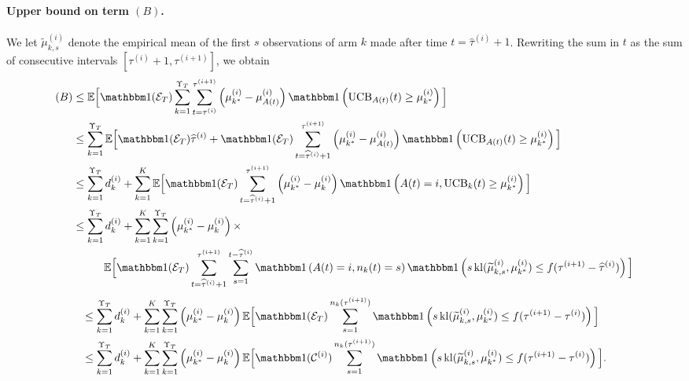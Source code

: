 \paragraph{Upper bound on term $(B)$.}
%
We let $\widetilde{\mu}_{k,s}^{(i)}$ denote the empirical mean of the first $s$ observations of arm $k$ made after time $t=\widehat{\tau}^{(i)}+1$.
Rewriting the sum in $t$ as the sum of consecutive intervals $[\tau^{(i)}+1, \tau^{(i+1)}]$, we obtain
%
\begin{align*}
    (B) & \leq \bE\Big[\indic(\cE_T)\sum_{k=1}^{\Upsilon_T} \sum_{t=\tau^{(i)}}^{\tau^{(i+1)}}\left(\mu_{k^*}^{(i)} - \mu_{A(t)}^{(i)}\right)\indic\left(\UCB_{A(t)}(t) \geq \mu_{k^*}^{(i)}\right)\Big] \\
    & \leq \sum_{k=1}^{\Upsilon_T}\bE\Big[\indic(\cE_T)\widehat{\tau}^{(i)} + \indic(\cE_T) \sum_{t=\widehat{\tau}^{(i)}+1}^{\tau^{(i+1)}}\left(\mu_{k^*}^{(i)} - \mu_{A(t)}^{(i)}\right)\indic\left(\UCB_{A(t)}(t) \geq \mu_{k^*}^{(i)}\right)\Big] \\
    & \leq \sum_{k=1}^{\Upsilon_T}d_k^{(i)}+ \sum_{k=1}^K \bE\Big[\indic(\cE_T) \sum_{t=\widehat{\tau}^{(i)}+1}^{\tau^{(i+1)}}\left(\mu_{k^*}^{(i)} - \mu_k^{(i)}\right)\indic\left(A(t)=i,\UCB_k(t) \geq \mu_{k^*}^{(i)}\right)\Big] \\
    & \leq \sum_{k=1}^{\Upsilon_T}d_k^{(i)}+ \sum_{k=1}^K \sum_{k=1}^{\Upsilon_T}\left(\mu_{k^*}^{(i)} - \mu_k^{(i)}\right)\times \\
    &\hspace{1cm}\bE\Big[\indic(\cE_T) \sum_{t=\widehat{\tau}^{(i)}+1}^{\tau^{(i+1)}}\sum_{s=1}^{t-\widehat{\tau}^{(i)}}\indic\left(A(t) = i,n_k(t) = s\right) \indic\left(s \, \kl(\widetilde{\mu}_{k,s}^{(i)}, \mu_{k^*}^{(i)}) \leq f(\tau^{(i+1)} - \widehat{\tau}^{(i)})\right)\Big]
\end{align*}%
\begin{align*}
    & \leq \sum_{k=1}^{\Upsilon_T}d_k^{(i)}+ \sum_{k=1}^K \sum_{k=1}^{\Upsilon_T}\left(\mu_{k^*}^{(i)} - \mu_k^{(i)}\right)\bE\Big[\indic(\cE_T) \sum_{s=1}^{n_k(\tau^{(i+1)})}\indic\left(s \, \kl(\widetilde{\mu}_{k,s}^{(i)}, \mu_{k^*}^{(i)}) \leq f(\tau^{(i+1)} - \tau^{(i)})\right)\Big]  \\
    & \leq \sum_{k=1}^{\Upsilon_T}d_k^{(i)}+ \sum_{k=1}^K \sum_{k=1}^{\Upsilon_T}\left(\mu_{k^*}^{(i)} - \mu_k^{(i)}\right)\bE\Big[\indic(\cC^{(i)}) \sum_{s=1}^{n_k(\tau^{(i+1)})}\indic\left(s \, \kl(\widetilde{\mu}_{k,s}^{(i)}, \mu_{k^*}^{(i)}) \leq f(\tau^{(i+1)} - \tau^{(i)})\right)\Big].
\end{align*}

